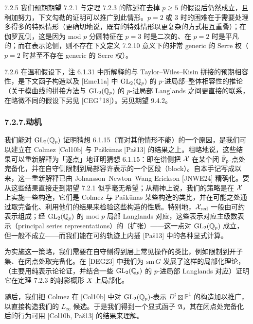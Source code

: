 \begin{rem}{7.2.5}\label{rem:a4-7-2-5}
我们预期期望 7.2.1 与定理 7.2.3 的陈述在去掉 $p\ge5$ 的假设后仍然成立，且稍加努力，下文勾勒的证明可以推广到此情形。$p=2$ 或 $3$ 时的困难在于需要处理多得多的特殊情形（更确切地说，既有的特殊情形以更复杂的方式相互重叠）；在伽罗瓦侧，这是因为 mod $p$ 分圆特征在 $p=3$ 时是二次的、在 $p=2$ 时是平凡的；而在表示论侧，则不存在下文定义 7.2.10 意义下的非常 generic 的 Serre 权（$p=2$ 时甚至不存在 generic 的 Serre 权）。
\end{rem}

\begin{rem}{7.2.6}\label{rem:a4-7-2-6}
在温和假设下，注 6.1.31 中所解释的与 Taylor--Wiles--Kisin 拼接的预期相容性，是下文函子构造以及 [Eme11a] 中 $\mathrm{GL}_2(\mathbb{Q}_p)$ 的 $p$-进局部--整体相容性的推论（关于模曲线的拼接方法与 $\mathrm{GL}_2(\mathbb{Q}_p)$ 的 $p$-进局部 Langlands 之间更直接的联系，在略微不同的假设下另见 [CEG$^{+}$18]）。另见期望 9.4.2。
\end{rem}

\subsubsection*{7.2.7.\quad 动机}

我们能对 $\mathrm{GL}_2(\mathbb{Q}_p)$ 证明猜想 6.1.15（而对其他情形不能）的一个原因，是我们可以建立在 Colmez [Col10b] 与 Paškūnas [Paš13] 的结果之上。粗略地说，这些结果可以重新解释为「逐点」地证明猜想 6.1.15：即在谱侧把 $\mathcal{X}$ 在某个闭 $\bar{\mathbb{F}}_p$-点处完备化，并在自守侧限制到局部容许表示的一个区段（block）。自本手记写成以来，这一重新解释已由 Johansson--Newton--Wang-Erickson [JNWE24] 精确化。要从这些结果直接走到期望 7.2.1 似乎毫无希望；从精神上说，我们的策略是在 $\mathcal{X}$ 上实施一些构造，它们是 Colmez 与 Paškūnas 某些构造的类比，并在可能之处通过取完备化、利用他们的结果来检验这些构造的性质。特别地，$\mathcal{X}_{\mathrm{red}}$ 一般由可约表示组成；经 $\mathrm{GL}_2(\mathbb{Q}_p)$ 的 mod $p$ 局部 Langlands 对应，这些表示对应主级数表示（principal series representations）的（扩张）——这一点对 $\mathrm{GL}_2(\mathbb{Q}_p)$ 成立，但一般不成立——而我们能在可约轨迹上内插 [Paš13] 中的各种显式计算。

为实施这一策略，我们需要在自守侧得到层上常见操作的类比，例如限制到开子集、在闭点处取完备化。在 [DEG23] 中我们为 $\mathrm{sm}\,G$ 发展了这样的局部化理论，（主要用纯表示论论证，并结合一些 $\mathrm{GL}_2(\mathbb{Q}_p)$ 的 $p$-进局部 Langlands 对应）证明它在定理 7.2.3 的射影概形 $X$ 上局部化。

随后，我们把 Colmez 在 [Col10b] 中对 $\mathrm{GL}_2(\mathbb{Q}_p)$-表示 $D^\natural\boxtimes\mathbb P^1$ 的构造加以推广，以直接构造我们的 $L_\infty$ 候选。于是我们得到一个显式函子 $\mathfrak{A}$，其在闭点处完备化后的行为可用 [Col10b, Paš13] 的结果来理解。

